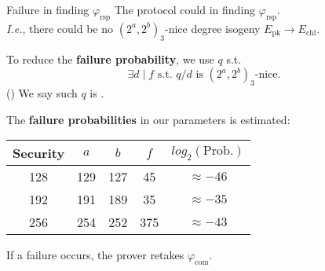 \begin{frame}{Failure in finding $\varphi_\mathrm{rsp}$}
    The protocol could  in finding $\varphi_\mathrm{rsp}$.\\[3pt]
    \textit{I.e.}, there could be no $(2^a, 2^b)_3$-nice degree isogeny $E_\mathrm{pk} \to E_\mathrm{chl}$.

    \mypause
    \vspace{10pt}
    To reduce the \textbf{failure probability}, we use $q$ s.t.
    $$
        \exists d \mid f \text{ s.t. } q/d \text{ is $(2^a, 2^b)_3$-nice}.
    $$
    ()
    We say such $q$ is .

    \mypause
    \vspace{10pt}
    The \textbf{failure probabilities} in our parameters is estimated:
    \begin{table}
        \begin{center}
            \begin{tabular}{c|c|c|c|c}
                Security & $a$ & $b$ & $f$ & $log_2(\text{Prob.})$ \\
                \hline
                128 & 129 & 127 & 45 & $\approx -46$ \\
                192 & 191 & 189 & 35 & $\approx -35$ \\
                256 & 254 & 252 & 375 & $\approx -43$
            \end{tabular}
        \end{center}
    \end{table}
    If a failure occurs, the prover retakes $\varphi_{\mathrm{com}}$.
\end{frame}

